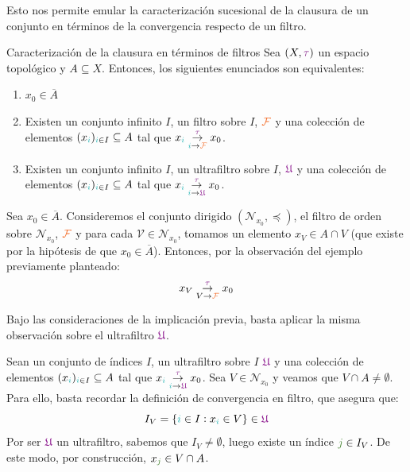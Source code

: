 \documentclass[titlepage,11pt,a4paper]{book}
\newcommand{\filt}{\ensuremath{\textcolor{Orange}{\mathcal{F}}}}
\newcommand{\ultf}{\ensuremath{\textcolor{Plum}{\mathfrak{U}}}}
\newcommand{\ii}{\ensuremath{\textcolor{TealBlue}{i}}}
\newcommand{\jj}{\ensuremath{\textcolor{OliveGreen}{j}}}
\newcommand{\VV}{\ensuremath{\mathcal{V}}}
\newcommand{\taut}{\textcolor{Fuchsia}{\tau}}
\newcommand{\borde}[1]{%
  \begingroup
  \setlength{\fboxsep}{2.5pt}%
  \setlength{\fboxrule}{1pt}%
  \textcolor{black}{\fbox{\normalcolor\ensuremath{#1}}}%
  \hspace{4pt}%
  \vspace{0.5 pt}
  \endgroup
}
\begin{document}
    Esto nos permite emular la caracterización sucesional de la clausura de un conjunto en términos de la convergencia respecto de un filtro.

    \begin{prop*}{Caracterización de la clausura en términos de filtros}
        Sea $(X, \taut)$ un espacio topológico y $A \subseteq X$. Entonces, los siguientes enunciados son equivalentes:

        \begin{enumerate}
            \item[(1)] $x_{0} \in \overline{A}$
            \item[(2)] Existen un conjunto infinito $I$, un filtro sobre $I$, $\filt$ y una colección de elementos $(x_{\ii})_{\ii \in I} \subseteq A$ tal que $x_{\ii} \underset{\ii \to \filt}{\overset{\taut}{\to}} x_{0}$.
            \item[(3)] Existen un conjunto infinito $I$, un ultrafiltro sobre $I$, $\ultf$ y una colección de elementos $(x_{\ii})_{\ii \in I} \subseteq A$ tal que $x_{\ii} \underset{\ii \to \ultf}{\overset{\taut}{\to}} x_{0}$.
        \end{enumerate}
    \end{prop*}

    \begin{dem}
        \borde{(1) \implies (2)} Sea $x_{0} \in \overline{A}$. Consideremos el conjunto dirigido $(\mathcal{N}_{x_0}, \preceq)$, el filtro de orden sobre $\mathcal{N}_{x_0}$, $\filt$ y para cada $\VV \in \mathcal{N}_{x_0}$, tomamos un elemento $x_{V} \in A \cap V$ (que existe por la hipótesis de que $x_{0} \in \overline{A}$). Entonces, por la observación del ejemplo previamente planteado:
        \[
        x_{V} \underset{V \to \filt}{\overset{\taut}{\to}} x_{0}
        \]

        \medskip
        \borde{(2) \implies (3)} Bajo las consideraciones de la implicación previa, basta aplicar la misma observación sobre el ultrafiltro $\ultf$.


        \medskip
        \borde{(3) \implies (1)} Sean un conjunto de índices $I$, un ultrafiltro sobre $I$ $\ultf$ y una colección de elementos $(x_{\ii})_{\ii \in I} \subseteq A$ tal que $x_{\ii} \underset{\ii \to \ultf}{\overset{\taut}{\to}} x_{0}$. Sea $V \in \mathcal{N}_{x_0}$ y veamos que $V \cap A \neq \emptyset$. Para ello, basta recordar la definición de convergencia en filtro, que asegura que:
        \[
        I_{V} = \{\ii \in I : x_{\ii} \in V\} \in \ultf
        \]
        Por ser $\ultf$ un ultrafiltro, sabemos que $I_{V} \neq \emptyset$, luego existe un índice $\jj \in I_{V}$. De este modo, por construcción, $x_{\jj} \in V \cap A$.
    \end{dem}
\end{document}
